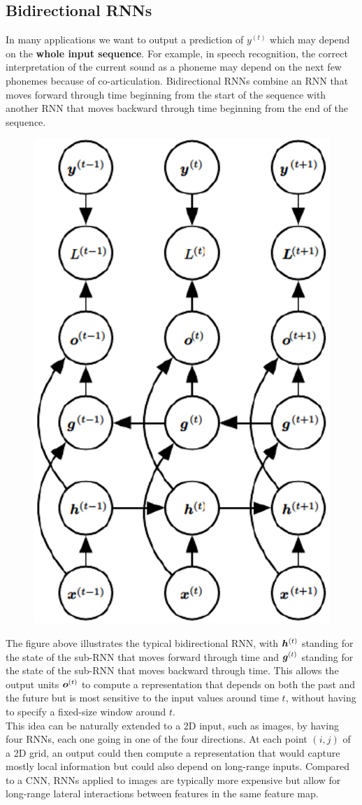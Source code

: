 \begin{multicols}{2}
	\subsection{Bidirectional RNNs}
	In many applications we want to output a prediction of $y^{(t)}$ which may depend on the \textbf{whole input sequence}.
	For example, in speech recognition, the correct interpretation of the current sound as a phoneme may depend on the next few phonemes because of co-articulation.
	Bidirectional RNNs combine an RNN that moves forward through time beginning from the start of the sequence with another RNN that moves backward through time beginning from the end of the sequence.
	\begin{figure}[H]
		\centering
		\includegraphics[width=0.4\linewidth]{images/bidir.PNG}
	\end{figure}
	The figure above illustrates the typical bidirectional RNN, with ${\bm{h}}^{(t)}$ standing for the state of the sub-RNN that moves forward through time and ${\bm{g}}^{(t)}$ standing for the state of the sub-RNN that moves backward through time.
	This allows the output units ${\bm{o}}^{(t)}$ to compute a representation that depends on both the past and the future but is most sensitive to the input values around time $t$, without having to specify a fixed-size window around $t$.\\

	This idea can be naturally extended to a 2D input, such as images, by having four RNNs, each one going in one of the four directions.
	At each point $(i,j)$ of a 2D grid, an output could then compute a representation that would capture mostly local information but could also depend on long-range inputs.
	Compared to a CNN, RNNs applied to images are typically more expensive but allow for long-range lateral interactions between features in the same feature map.


\end{multicols}
